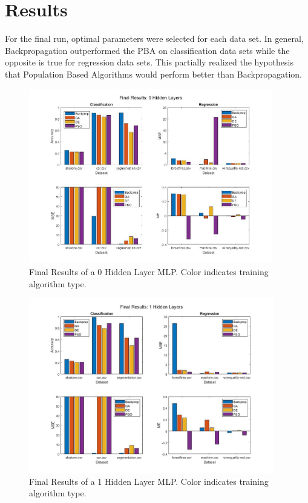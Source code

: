 \documentclass[twoside,11pt]{article}
\begin{document}
\section{Results}

	For the final run, optimal parameters were selected for each data set. In general, Backpropagation outperformed the PBA on classification data sets while the opposite is true for regression data sets. This partially realized the hypothesis that Population Based Algorithms would perform better than Backpropagation.

	\begin{figure}[h]
		\centering
		\includegraphics[height=3in]{FINAL_FIGS/0_hl.jpg}
		\caption{Final Results of a 0 Hidden Layer MLP. Color indicates training algorithm type.}
		\label{0-hl}
	\end{figure}
	
	\begin{figure}[h]
		\centering
		\includegraphics[height=3in]{FINAL_FIGS/1_hl.jpg}
		\caption{Final Results of a 1 Hidden Layer MLP. Color indicates training algorithm type.}
		\label{1-hl}
	\end{figure}
	
\end{document}
